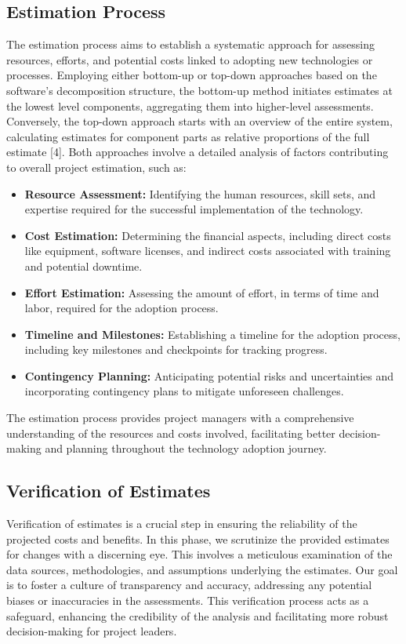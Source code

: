 \documentclass{article}
\begin{document}
\subsection{Estimation Process}
The estimation process aims to establish a systematic approach for assessing resources, efforts, and potential costs linked to adopting new technologies or processes. Employing either bottom-up or top-down approaches based on the software's decomposition structure, the bottom-up method initiates estimates at the lowest level components, aggregating them into higher-level assessments. Conversely, the top-down approach starts with an overview of the entire system, calculating estimates for component parts as relative proportions of the full estimate [4]. Both approaches involve a detailed analysis of factors contributing to overall project estimation, such as:
\begin{itemize}
    \item \textbf{Resource Assessment:} Identifying the human resources, skill sets, and expertise required for the successful implementation of the technology.
    \item \textbf{Cost Estimation:} Determining the financial aspects, including direct costs like equipment, software licenses, and indirect costs associated with training and potential downtime.
    \item \textbf{Effort Estimation:} Assessing the amount of effort, in terms of time and labor, required for the adoption process.
    \item \textbf{Timeline and Milestones:} Establishing a timeline for the adoption process, including key milestones and checkpoints for tracking progress.
    \item \textbf{Contingency Planning:} Anticipating potential risks and uncertainties and incorporating contingency plans to mitigate unforeseen challenges.
\end{itemize}

\noindent The estimation process provides project managers with a comprehensive understanding of the resources and costs involved, facilitating better decision-making and planning throughout the technology adoption journey.


\subsection{Verification of Estimates}
Verification of estimates is a crucial step in ensuring the reliability of the projected costs and benefits. In this phase, we scrutinize the provided estimates for changes with a discerning eye. This involves a meticulous examination of the data sources, methodologies, and assumptions underlying the estimates. Our goal is to foster a culture of transparency and accuracy, addressing any potential biases or inaccuracies in the assessments. This verification process acts as a safeguard, enhancing the credibility of the analysis and facilitating more robust decision-making for project leaders.
\end{document}
